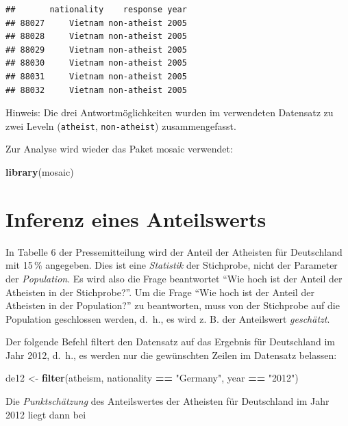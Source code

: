 \documentclass[12pt,ngerman,paper=a4,pagesize,DIV=13]{scrreprt}
\newenvironment{Shaded}{\begin{snugshade}}{\end{snugshade}}
\newcommand{\KeywordTok}[1]{\textcolor[rgb]{0.13,0.29,0.53}{\textbf{#1}}}
\newcommand{\NormalTok}[1]{#1}
\newcommand{\OperatorTok}[1]{\textcolor[rgb]{0.81,0.36,0.00}{\textbf{#1}}}
\newcommand{\StringTok}[1]{\textcolor[rgb]{0.31,0.60,0.02}{#1}}
\begin{document}
\begin{verbatim}
##       nationality    response year
## 88027     Vietnam non-atheist 2005
## 88028     Vietnam non-atheist 2005
## 88029     Vietnam non-atheist 2005
## 88030     Vietnam non-atheist 2005
## 88031     Vietnam non-atheist 2005
## 88032     Vietnam non-atheist 2005
\end{verbatim}

Hinweis: Die drei Antwortmöglichkeiten wurden im verwendeten Datensatz
zu zwei Leveln (\texttt{atheist}, \texttt{non-atheist}) zusammengefasst.

Zur Analyse wird wieder das Paket mosaic verwendet:

\begin{Shaded}
\begin{Highlighting}[]
\KeywordTok{library}\NormalTok{(mosaic)}
\end{Highlighting}
\end{Shaded}

\hypertarget{inferenz-eines-anteilswerts}{%
\section{Inferenz eines
Anteilswerts}\label{inferenz-eines-anteilswerts}}

In Tabelle 6 der Pressemitteilung wird der Anteil der Atheisten für
Deutschland mit 15\(\,\)\% angegeben. Dies ist eine \emph{Statistik} der
Stichprobe, nicht der Parameter der \emph{Population}. Es wird also die
Frage beantwortet \enquote{Wie hoch ist der Anteil der Atheisten in der
Stichprobe?}. Um die Frage \enquote{Wie hoch ist der Anteil der
Atheisten in der Population?} zu beantworten, muss von der Stichprobe
auf die Population geschlossen werden, d.~h., es wird z. B. der
Anteilswert \emph{geschätzt}.

Der folgende Befehl filtert den Datensatz auf das Ergebnis für
Deutschland im Jahr 2012, d.~h., es werden nur die gewünschten Zeilen im
Datensatz belassen:

\begin{Shaded}
\begin{Highlighting}[]
\NormalTok{de12 <-}\StringTok{ }\KeywordTok{filter}\NormalTok{(atheism, nationality }\OperatorTok{==}\StringTok{ "Germany"}\NormalTok{, year }\OperatorTok{==}\StringTok{ "2012"}\NormalTok{)}
\end{Highlighting}
\end{Shaded}

Die \emph{Punktschätzung} des Anteilswertes der Atheisten für
Deutschland im Jahr 2012 liegt dann bei
\end{document}
